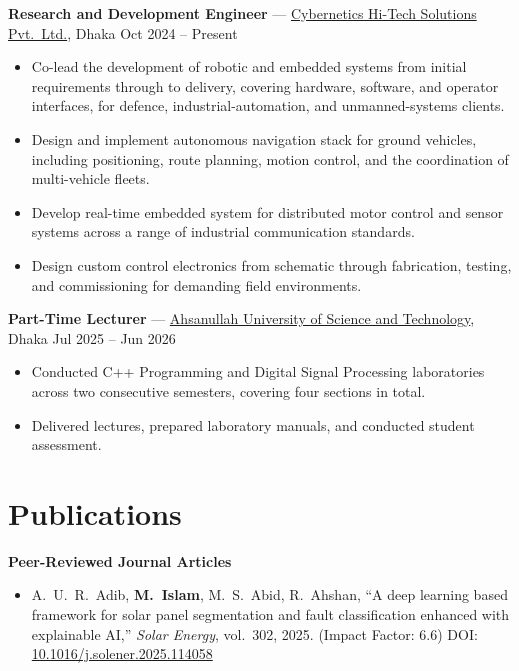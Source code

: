 \documentclass[10pt]{article}
\newcommand{\me}{\textbf{M.\ Islam}}
\begin{document}
\textbf{Research and Development Engineer} ---
\href{https://cyberneticsbd.com/}{Cybernetics Hi-Tech Solutions Pvt.\ Ltd.}, Dhaka
\hfill Oct 2024 -- Present
\begin{itemize}
    \item Co-lead the development of robotic and embedded systems from initial requirements
    through to delivery, covering hardware, software, and operator interfaces, for defence,
    industrial-automation, and unmanned-systems clients.
    \item Design and implement autonomous navigation stack for ground vehicles, including
    positioning, route planning, motion control, and the coordination of multi-vehicle fleets.
    \item Develop real-time embedded system for distributed motor control and sensor systems
    across a range of industrial communication standards.
    \item Design custom control electronics from schematic through fabrication, testing, and
    commissioning for demanding field environments.
\end{itemize}

\textbf{Part-Time Lecturer} ---
\href{https://www.aust.edu/}{Ahsanullah University of Science and Technology}, Dhaka
\hfill Jul 2025 -- Jun 2026
\begin{itemize}
    \item Conducted C++ Programming and Digital Signal Processing laboratories across two
    consecutive semesters, covering four sections in total.
    \item Delivered lectures, prepared laboratory manuals, and conducted student assessment.
\end{itemize}

\section*{Publications}

\textbf{Peer-Reviewed Journal Articles}
\begin{itemize}
    \item A.\ U.\ R.\ Adib, \me, M.\ S.\ Abid, R.\ Ahshan, ``A deep learning based framework for
    solar panel segmentation and fault classification enhanced with explainable AI,''
    \textit{Solar Energy}, vol.\ 302, 2025. (Impact Factor: 6.6)
    DOI: \href{https://doi.org/10.1016/j.solener.2025.114058}{10.1016/j.solener.2025.114058}
\end{itemize}
\end{document}
